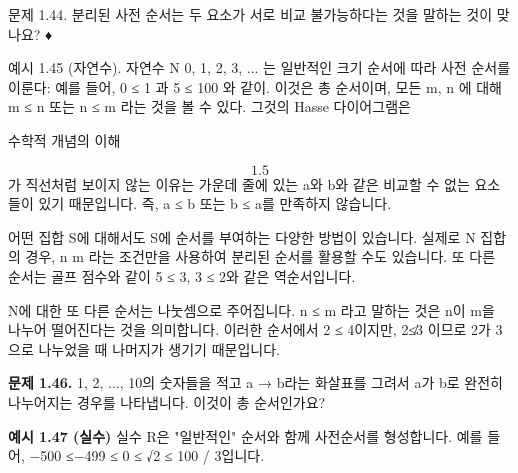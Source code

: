 \documentclass[11pt, a4paper, twoside, openany]{book}
\begin{document}
\par\medskip
문제 1.44.
분리된 사전 순서는 두 요소가 서로 비교 불가능하다는 것을 말하는 것이 맞나요?
♦

\par\medskip
예시 1.45 (자연수). 자연수 N {0, 1, 2, 3, ...} 는 일반적인 크기 순서에 따라 사전 순서를 이룬다: 예를 들어, 0 ≤ 1 과 5 ≤ 100 와 같이. 이것은 총 순서이며, 모든 m, n 에 대해 m ≤ n 또는 n ≤ m 라는 것을 볼 수 있다.  그것의 Hasse 다이어그램은

\par\medskip
수학적 개념의 이해

\par\medskip
$$1.5$$가 직선처럼 보이지 않는 이유는 가운데 줄에 있는 a\hspace{0pt}와 b\hspace{0pt}와 같은 비교할 수 없는 요소들이 있기 때문입니다. 즉,  a ≤ b 또는 b ≤ a\hspace{0pt}를 만족하지 않습니다.

\par\medskip
어떤 집합 S\hspace{0pt}에 대해서도 S\hspace{0pt}에 순서를 부여하는 다양한 방법이 있습니다.
실제로 N 집합의 경우, n  m 라는 조건만을 사용하여 분리된 순서를 활용할 수도 있습니다. 또 다른 순서는 골프 점수와 같이 5 ≤ 3, 3 ≤ 2\hspace{0pt}와 같은 역순서입니다.

\par\medskip
N\hspace{0pt}에 대한 또 다른 순서는 나눗셈으로 주어집니다. n ≤ m 라고 말하는 것은 n\hspace{0pt}이 m\hspace{0pt}을 나누어 떨어진다는 것을 의미합니다. 이러한 순서에서 2 ≤ 4\hspace{0pt}이지만, 2≰3 이므로 2\hspace{0pt}가 3\hspace{0pt}으로 나누었을 때 나머지가 생기기 때문입니다.

\par\medskip
\textbf{문제 1.46.}
1, 2, ..., 10\hspace{0pt}의 숫자들을 적고 a → b\hspace{0pt}라는 화살표를 그려서 a\hspace{0pt}가 b\hspace{0pt}로 완전히 나누어지는 경우를 나타냅니다. 이것이 총 순서인가요?

\par\medskip
\textbf{예시 1.47 (실수)}
실수 R\hspace{0pt}은 "일반적인" 순서와 함께 사전순서를 형성합니다. 예를 들어, −500 ≤−499 ≤ 0 ≤ √2 ≤ 100 / 3\hspace{0pt}입니다.
\end{document}
